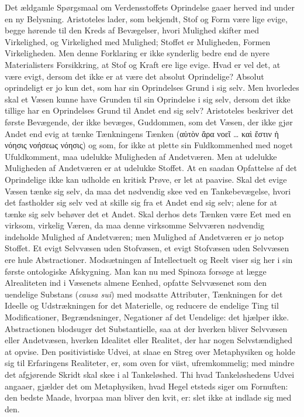 \documentclass[12pt]{article}
\newcommand{\opage}[1]{\marginnote{\footnotesize\textit{[#1]}}}
\begin{document}
Det ældgamle Spørgsmaal om Verdensstoffets Oprindelse gaaer herved
ind under en ny Belysning. Aristoteles lader, som bekjendt, Stof og
Form være lige evige, begge hørende til den Kreds af Bevægelser,
hvori Mulighed skifter med Virkelighed, og Virkelighed med
Mulighed; Stoffet er Muligheden, Formen Virkeligheden. Men denne
Forklaring er ikke synderlig bedre end de nyere Materialisters
Forsikkring, at Stof og Kraft ere lige evige. Hvad er vel det, at
være evigt, dersom det ikke er at være det absolut Oprindelige?
Absolut oprindeligt er jo kun det, som har sin Oprindelses Grund i
sig selv. Men hvorledes skal et Væsen kunne have Grunden til sin
Oprindelse i sig selv, dersom det ikke tillige har en Oprindelses
Grund til Andet end sig selv? Aristoteles beskriver det første
Bevægende, der ikke bevæges, Guddommen, som det Væsen, der ikke
gjør Andet end evig at tænke Tænkningens Tænken (αὑτὸν ἄρα νοεῖ
\ldots{} καὶ ἔστιν ἡ νόησις νοήσεως νόησις) og som, for ikke at
plette sin Fuldkommenhed med noget Ufuldkomment, maa udelukke
Muligheden af Andetværen. Men at udelukke Muligheden af
\opage{37} Andetværen er at udelukke Stoffet. At en saadan Opfattelse af det
Oprindelige ikke kan udholde en kritisk Prøve, er let at paavise.
Skal det evige Væsen tænke sig selv, da maa det nødvendig skee ved
en Tankebevægelse, hvori det fastholder sig selv ved at skille sig
fra et Andet end sig selv; alene for at tænke sig selv behøver det
et Andet. Skal derhos dets Tænken være Eet med en virksom, virkelig
Væren, da maa denne virksomme Selvværen nødvendig indeholde Mulighed
af Andetværen; men Mulighed af Andetværen er jo netop Stoffet. Et
evigt Selvvæsen uden Stofvæsen, et evigt Stofvæsen uden Selvvæsen
ere hule Abstractioner. Modsætningen af Intellectuelt og Reelt viser
sig her i sin første ontologiske Afskygning. Man kan nu med Spinoza
forsøge at lægge Alrealiteten ind i Væsenets almene Eenhed, opfatte
Selvvæsenet som den uendelige Substans (\textit{causa sui}) med
modsatte Attributer, Tænkningen for det Ideelle og Udstrækningen for
det Materielle, og reducere de endelige Ting til Modificationer,
Begrændsninger, Negationer af det Uendelige: det hjælper ikke.
Abstractionen blodsuger det Substantielle, saa at der hverken bliver
Selvvæsen eller Andetvæsen, hverken Idealitet eller Realitet, der
har nogen Selvstændighed at opvise. Den positivistiske Udvei, at
slaae en Streg over Metaphysiken og holde sig til Erfaringens
Realiteter, er, som oven for viist, ufremkommelig; med mindre det
afgjørende Skridt skal skee i al Tankeløshed. Thi hvad
Tankeløshedens Udvei angaaer, gjælder det om Metaphysiken, hvad
Hegel etsteds siger om Fornuften: den bedste Maade, hvorpaa man
bliver den kvit, er: slet ikke at indlade sig med den.
\end{document}
